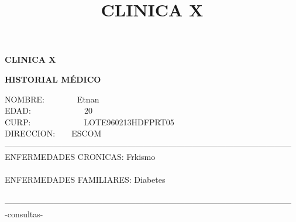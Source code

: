 \documentclass[10pt,a4paper]{letter}
\title{\bf CLINICA X}
\begin{document}
\begin{center}
{\scshape\LARGE \bf CLINICA X\par}
{\bf HISTORIAL MÉDICO\\}
\end{center}
NOMBRE:\ \ \ \ \ \ \ \ Etnan\\
EDAD:\ \ \ \ \ \ \ \ \ \ \ \ \ 20\\
CURP:\ \ \ \ \ \ \ \ \ \ \ \ \ LOTE960213HDFPRT05 \\
DIRECCION:\ \ \ \ ESCOM\\
--------------------------------------------------------------------------------------------------------- \\
ENFERMEDADES CRONICAS: Frkismo\\ \\
ENFERMEDADES FAMILIARES: Diabetes \\ \\
--------------------------------------------------------------------------------------------------------- \\-consultas-
\end{document}
